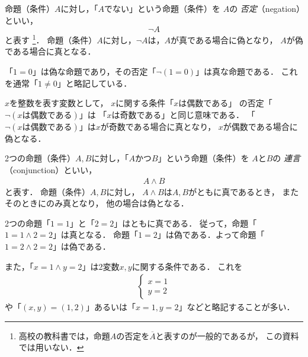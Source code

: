   命題（条件）$A$に対し，「$A$でない」という命題（条件）を
  $A$の
  \emph{否定}（negation）といい，
  \begin{equation}
   \lnot A
    \label{eq:negation}
  \end{equation}
    と表す
  \footnote{高校の教科書では，命題$A$の否定を$\overline{A}$と表すのが一般的であるが，
  この資料では用いない．}．
  命題（条件）$A$に対し，$\lnot A$は，$A$が真である場合に偽となり，
  $A$が偽である場合に真となる．
  
  \begin{ex}
    「$1=0$」は偽な命題であり，その否定「$\lnot (1=0)$」は真な命題である．
    これを通常「$1 \neq 0$」と略記している．

    $x$を整数を表す変数として，
    $x$に関する条件「$x$は偶数である」
    の否定「$\lnot ( x \text{は偶数である})$」は
    「$x$は奇数である」と同じ意味である．
    「$\lnot ( x \text{は偶数である})$」は$x$が奇数である場合に真となり，
    $x$が偶数である場合に偽となる．
  \end{ex}

  2つの命題（条件）$A,  B$に対し，「$A$かつ$B$」という命題（条件）を
  $A$と$B$の
  \emph{連言}（conjunction）といい，
  \begin{align}
   A \land B 
    \label{eq:conjunction}
  \end{align}
  と表す．
  命題（条件）$A,  B$に対し，
  $A \land B$は$A,  B$がともに真であるとき，
  またそのときにのみ真となり，
  他の場合は偽となる．

  \begin{ex}
    2つの命題「$1=1$」と「$2=2$」はともに真である．
    従って，命題「$1=1 \land 2=2$」は真となる．
     命題「$1=2$」は偽である．よって命題「$1=2 \land 2=2$」は偽である．

     また，「$x=1 \land y=2$」は2変数$x,  y$に関する条件である．
     これを
     \begin{align*}
       \left\{
         \begin{aligned}
          x = 1 \\
          y = 2
         \end{aligned}
       \right.
     \end{align*}
     や「$(x,y)=(1,2)$」あるいは「$ x = 1,  y=2$」などと略記することが多い．
  \end{ex}

